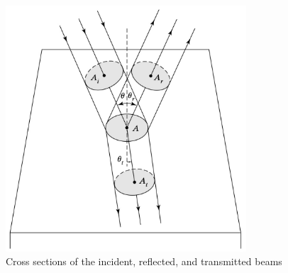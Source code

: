 \begin{figure}
  \centering
  \includegraphics[width=0.8\textwidth]{Chapters/Figures/CSA Example for the Incident, Reflected, and Transmitted Electromagnetic Waves.jpg}
  \caption{Cross sections of the incident, reflected, and transmitted beams}
\end{figure}

